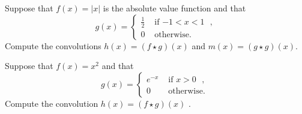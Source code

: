 \documentclass[11pt]{article}
\begin{document}

\begin{exercise}
    Suppose that $f(x) = |x|$ is the absolute value function and that 
    \[
        g(x) = \left\{\begin{array}{cc} \frac 1 2 & \text{ if $-1 < x < 1$ }, \\ 0 & \text{ otherwise. } \end{array}\right.
    \]
    Compute the convolutions $h(x) = (f \star g)(x)$ and $m(x) = (g \star g)(x)$.
\end{exercise}
\begin{solution}     
\end{solution}


\begin{exercise}
    Suppose that $f(x) = x^2$ and that
    \[
        g(x) = \left\{\begin{array}{cc} e^{-x} & \text{ if $x > 0$ }, \\ 0 & \text{ otherwise. } \end{array}\right.
    \]
    Compute the convolution $h(x) = (f \star g)(x)$ .
\end{exercise}

\begin{solution}     
\end{solution}


\begin{exercise}
\end{exercise}
\begin{solution}     
\end{solution}

\begin{exercise}
\end{exercise}
\begin{solution}     
\end{solution}
\end{document}
